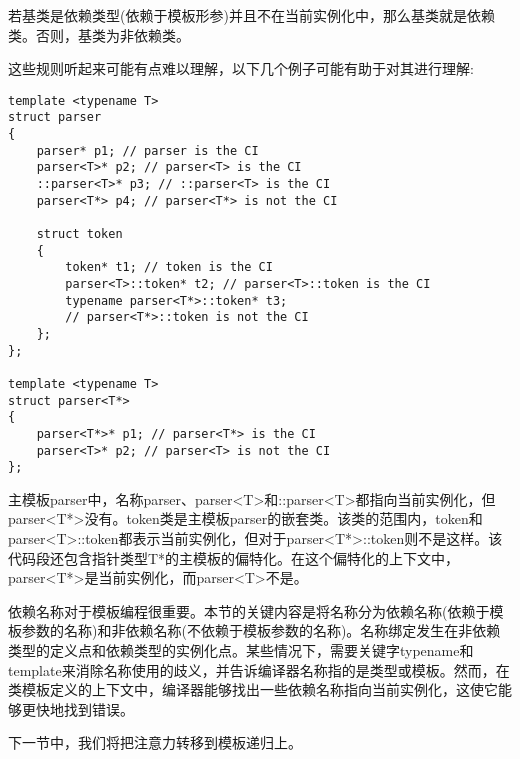 \begin{tcolorbox}[breakable,enhanced jigsaw,colback=blue!5!white,colframe=blue!75!black,title={Note}]
若基类是依赖类型(依赖于模板形参)并且不在当前实例化中，那么基类就是依赖类。否则，基类为非依赖类。
\end{tcolorbox}

这些规则听起来可能有点难以理解，以下几个例子可能有助于对其进行理解:

\begin{lstlisting}[style=styleCXX]
template <typename T>
struct parser
{
	parser* p1; // parser is the CI
	parser<T>* p2; // parser<T> is the CI
	::parser<T>* p3; // ::parser<T> is the CI
	parser<T*> p4; // parser<T*> is not the CI

	struct token
	{
		token* t1; // token is the CI
		parser<T>::token* t2; // parser<T>::token is the CI
		typename parser<T*>::token* t3;
		// parser<T*>::token is not the CI
	};
};

template <typename T>
struct parser<T*>
{
	parser<T*>* p1; // parser<T*> is the CI
	parser<T>* p2; // parser<T> is not the CI
};
\end{lstlisting}

主模板parser中，名称parser、parser<T>和::parser<T>都指向当前实例化，但parser<T*>没有。token类是主模板parser的嵌套类。该类的范围内，token和parser<T>::token都表示当前实例化，但对于parser<T*>::token则不是这样。该代码段还包含指针类型T*的主模板的偏特化。在这个偏特化的上下文中，parser<T*>是当前实例化，而parser<T>不是。

依赖名称对于模板编程很重要。本节的关键内容是将名称分为依赖名称(依赖于模板参数的名称)和非依赖名称(不依赖于模板参数的名称)。名称绑定发生在非依赖类型的定义点和依赖类型的实例化点。某些情况下，需要关键字typename和template来消除名称使用的歧义，并告诉编译器名称指的是类型或模板。然而，在类模板定义的上下文中，编译器能够找出一些依赖名称指向当前实例化，这使它能够更快地找到错误。

下一节中，我们将把注意力转移到模板递归上。























